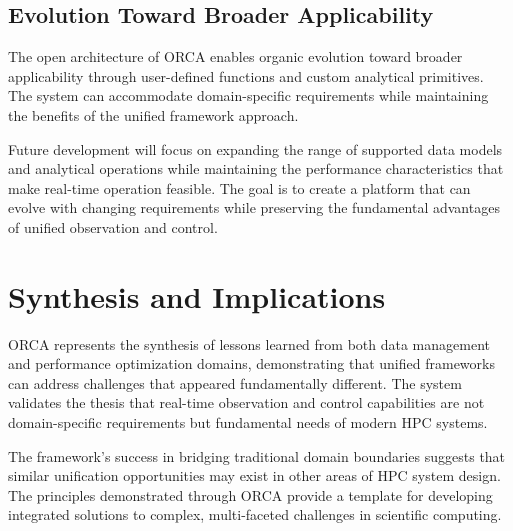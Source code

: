 \subsection{Evolution Toward Broader Applicability}

The open architecture of ORCA enables organic evolution toward broader applicability through
user-defined functions and custom analytical primitives.
The system can accommodate domain-specific requirements while maintaining the benefits of the
unified framework approach.

Future development will focus on expanding the range of supported data models and analytical
operations while maintaining the performance characteristics that make real-time operation
feasible.
The goal is to create a platform that can evolve with changing requirements while preserving
the fundamental advantages of unified observation and control.

\section{Synthesis and Implications}

ORCA represents the synthesis of lessons learned from both data management and performance
optimization domains, demonstrating that unified frameworks can address challenges that appeared
fundamentally different.
The system validates the thesis that real-time observation and control capabilities are not
domain-specific requirements but fundamental needs of modern HPC systems.

The framework's success in bridging traditional domain boundaries suggests that similar
unification opportunities may exist in other areas of HPC system design.
The principles demonstrated through ORCA provide a template for developing integrated solutions
to complex, multi-faceted challenges in scientific computing. 